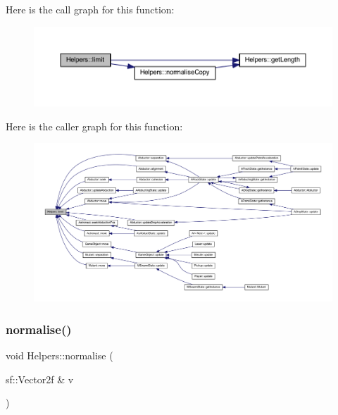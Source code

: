 Here is the call graph for this function\+:
\nopagebreak
\begin{figure}[H]
\begin{center}
\leavevmode
\includegraphics[width=350pt]{namespace_helpers_a7b90b08e0cd27e52500271b582f8797b_cgraph}
\end{center}
\end{figure}
Here is the caller graph for this function\+:
\nopagebreak
\begin{figure}[H]
\begin{center}
\leavevmode
\includegraphics[width=350pt]{namespace_helpers_a7b90b08e0cd27e52500271b582f8797b_icgraph}
\end{center}
\end{figure}
\mbox{\label{namespace_helpers_acf3ecf44a1d56b27ec102715bae903c1}} 
\subsubsection{\texorpdfstring{normalise()}{normalise()}}
{\footnotesize\ttfamily void Helpers\+::normalise (\begin{DoxyParamCaption}\item[{sf\+::\+Vector2f \&}]{v }\end{DoxyParamCaption})\hspace{0.3cm}{\ttfamily [inline]}}

